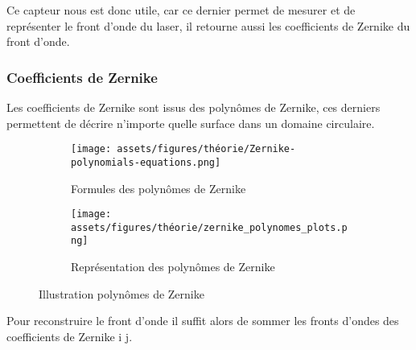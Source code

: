 Ce capteur nous est donc utile, car ce dernier permet de mesurer et de représenter le front d'onde du laser, il retourne aussi les coefficients de
Zernike du front d'onde.

\newpage
\subsubsection{Coefficients de Zernike}

Les coefficients de Zernike sont issus des polynômes de Zernike, ces derniers
permettent de décrire n'importe quelle surface dans un domaine circulaire.
\begin{figure}[H]
  \centering
  \begin{subfigure}{.5\textwidth}
    \centering
    \texttt{[image: assets/figures/théorie/Zernike-polynomials-equations.png]}
    \caption{Formules des polynômes de Zernike}
    \label{fig:formules_poly_Zernike}
  \end{subfigure}%
  \begin{subfigure}{.5\textwidth}
    \centering
    \texttt{[image: assets/figures/théorie/zernike\_polynomes\_plots.png]}
    \caption{Représentation des polynômes de Zernike}
    \label{fig:plots_des_polynomes_Zernike}
  \end{subfigure}
  \caption[Illustration polynômes de Zernike]{Illustration polynômes de Zernike \cite{Zernike_docteur_Damien}\footnotemark}
  \label{fig:illu_poly_Zernike}
\end{figure}


Pour reconstruire le front d'onde il suffit alors de sommer les fronts d'ondes des coefficients de Zernike i j.